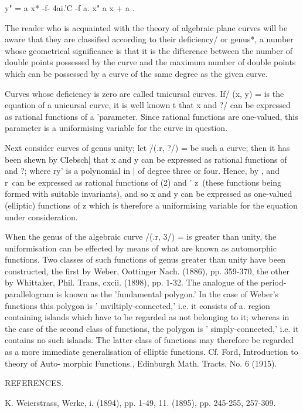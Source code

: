 {y" = a x* -f- 4ai.'C -f a. x" a x + a .

The reader who is acquainted with the theory of algebraic plane curves
will be aware that they are classified according to their deficiency/
or genus*, a number whose geometrical significance is that it is the
difterence between the number of double points possessed by the curve
and the maximum number of double points which can be possessed by a
curve of the same degree as the given curve.

Curves whose deficiency is zero are called tmicursal curves. If/ (x,
y) = is the equation of a unicursal curve, it is well known t that x
and ?/ can be expressed as rational functions of a 'parameter. Since
rational functions are one-valued, this parameter is a uniformising
variable for the curve in question.

Next consider curves of genus unity; let /(.r, ?/) = be such a curve;
then it has been shewn by CIebsch| that x and y can be expressed as
rational functions of and ?; where ry' is a polynomial in | of degree
three or four. Hence, by , and r\ can be expressed as rational
functions of (2) and ' z\ (these functions being formed with suitable
invariants), and so x and y can be expressed as one-valued (elliptic)
functions of z which is therefore a uniformising variable for the
equation under consideration.

When the genus of the algebraic curve /(.r, 3/) = is greater than
unity, the uniformisation can be effected by means of what are known
as automorphic functions. Two classes of such functions of genus
greater than unity have been constructed, the first by Weber,
Oottinger Nach. (1886), pp. 359-370, the other by Whittaker, Phil.
Trans, cxcii. (1898), pp. 1-32. The analogue of the
period-parallelogram is known as the 'fundamental polygon.' In the
case of Weber's functions this polygon is ' mviltiply-connected,' i.e.
it consists of a. region containing islands which have to be regarded
as not belonging to it; whereas in the case of the second class of
functions, the polygon is ' simply-connected,' i.e. it contains no
such islands. The latter class of functions may therefore be regarded
as a more immediate generalisation of elliptic functions. Cf. Ford,
Introduction to theory of Auto- morphic Functions., Edinburgh Math.
Tracts, No. 6 (1915).

REFERENCES.

K. Weierstrass, Werke, i. (1894), pp. 1-49, 11. (1895), pp. 245-255,
257-309.

}
